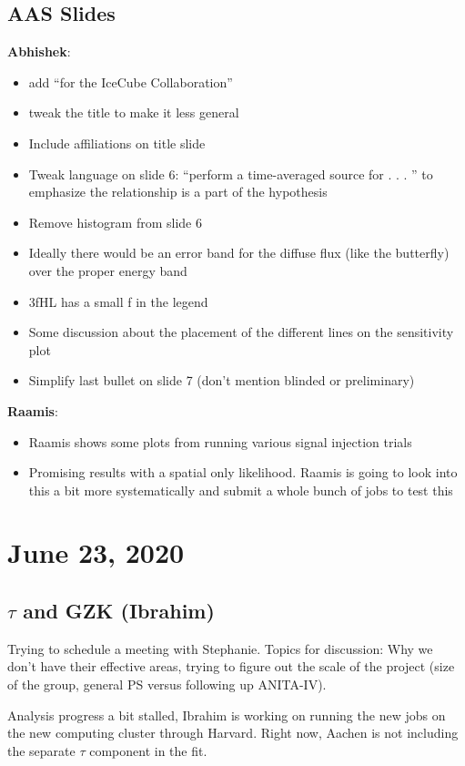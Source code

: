 \section{AAS Slides}
\textbf{Abhishek}:
\begin{itemize}
\itemsep-1em
    \item add ``for the IceCube Collaboration''
    \item tweak the title to make it less general
    \item Include affiliations on title slide
    \item Tweak language on slide 6: ``perform a time-averaged source for . . . '' to emphasize the relationship is a part of the hypothesis
    \item Remove histogram from slide 6
    \item Ideally there would be an error band for the diffuse flux (like the butterfly) over the proper energy band
    \item 3fHL has a small f in the legend
    \item Some discussion about the placement of the different lines on the sensitivity plot
    \item Simplify last bullet on slide 7 (don't mention blinded or preliminary)
\end{itemize}

\textbf{Raamis}:
\begin{itemize}
\itemsep-1em
    \item Raamis shows some plots from running various signal injection trials
    \item Promising results with a spatial only likelihood. Raamis is going to look into this a bit more systematically and submit a whole bunch of jobs to test this
\end{itemize}

\chapter{June 23, 2020}
\section{$\tau$ and GZK (Ibrahim)}
Trying to schedule a meeting with Stephanie. Topics for discussion: Why we don't have their effective areas, trying to figure out the scale of the project (size of the group, general PS versus following up ANITA-IV).

Analysis progress a bit stalled, Ibrahim is working on running the new jobs on the new computing cluster through Harvard. Right now, Aachen is not including the separate $\tau$ component in the fit.

